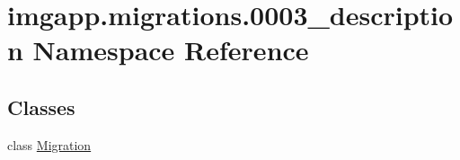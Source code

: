 \hypertarget{namespaceimgapp_1_1migrations_1_10003__description}{}\section{imgapp.\+migrations.0003\+\_\+description Namespace Reference}
\label{namespaceimgapp_1_1migrations_1_10003__description}
\subsection*{Classes}
\begin{DoxyCompactItemize}
\item 
class \hyperlink{classimgapp_1_1migrations_1_10003__description_1_1Migration}{Migration}
\end{DoxyCompactItemize}
